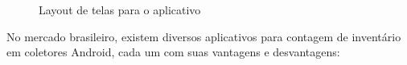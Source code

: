 \begin{figure}[htbp]
{    }
    \quad
    \label{fig:grupo01}
    \caption{Layout de telas para o aplicativo}
\end{figure}

No mercado brasileiro, existem diversos aplicativos para contagem de inventário em coletores Android, cada um com suas vantagens e desvantagens:

